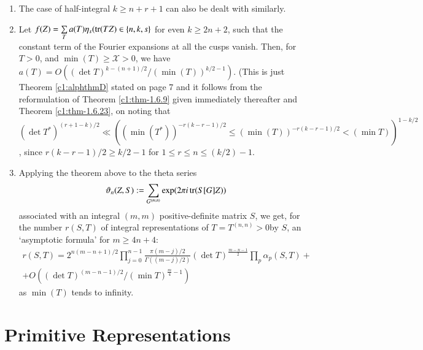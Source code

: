 \begin{remarks*}
\begin{enumerate}
\renewcommand{\labelenumi}{\theenumi)}
\item The case of half-integral $k\geq n+r+1$ can also be dealt with
  similarly.

\item Let $f(Z)=\sum\limits_{T}a(T)\eta_{s}(\operatorname{tr}(TZ)\in\{n,k,s\}$ for
  even $k\geq 2n+2$, such that the constant term of the Fourier
  expansions at all the cusps vanish. Then, for $T>0$, and
  $\min(T)\geq \mathscr{X}>0$, we have $a(T)=O((\det
  T)^{k-(n+1)/2}/(\min (T))^{k/2-1})$. (This is just
  Theorem \ref{c1:alphthmD} stated on page 7 and it follows from
  the reformulation of Theorem \ref{c1:thm-1.6.9} given immediately
  thereafter and Theorem \ref{c1:thm-1.6.23}, on noting that $(\det
  T^{\ast})^{(r+1-k)/2}\ll ((\min(T^{\ast}))^{-r(k-r-1)/2}\leq (\min
  (T))^{-r(k-r-1)/2}<(\min T))^{1-k/2}$, since $r(k-r-1)/2\geq k/2-1$
  for $1\leq r\leq n\leq (k/2)-1$.

\item Applying the theorem above to the theta series
  $$\vartheta_{n}(Z,S):=\sum_{G^{(m,n)}}\exp(2\pi i\operatorname{tr}(S[G]Z))$$
  associated with an integral $(m,m)$ positive-definite matrix $S$, we
  get, for the number $r(S,T)$ of integral representations of
  $T=T^{(n,n)}>0$\pageoriginale by $S$, an `asymptotic formula' for
  $m\geq 4n+4$: 
\begin{gather*}
r(S,T)=2^{n(m-n+1)/2}\prod^{n-1}_{j=0}\frac{\pi(m-j)/2}{\Gamma((m-j)/2)}(\det
T)^{\frac{m-n-1}{2}}\prod_{p}\alpha_{p}(S,T)+\\
+O((\det T)^{(m-n-1)/2}/(\min T)^{\frac{m}{4}-1})
\end{gather*}
as $\min(T)$ tends to infinity.
\end{enumerate}
\end{remarks*}

\section{Primitive Representations}\label{c1:sec-1.7}\pageoriginale

